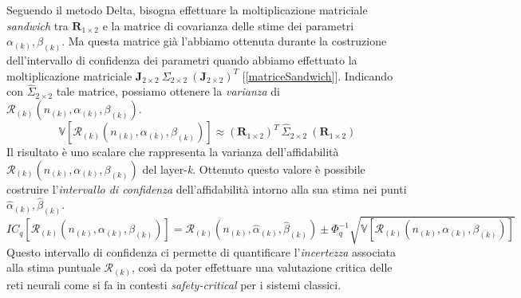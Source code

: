 \documentclass[10pt]{article} %
\begin{document}
Seguendo il metodo Delta, bisogna effettuare la moltiplicazione matriciale \textit{sandwich} tra $\mathbf{R}_{1\times2}$ e la matrice di covarianza delle stime dei parametri $\alpha_{(k)}, \beta_{(k)}$. Ma questa matrice già l'abbiamo ottenuta durante la costruzione dell'intervallo di confidenza dei parametri quando abbiamo effettuato la moltiplicazione matriciale $\mathbf{J}_{2\times2}\ \Sigma_{2\times2}\ (\mathbf{J}_{2\times2})^{T}$ [\ref{matriceSandwich}]. Indicando con $\hat{\Sigma}_{2\times2}$ tale matrice, possiamo ottenere la \textit{varianza} di $\mathcal{R}_{(k)}(n_{(k)}, \alpha_{(k)}, \beta_{(k)})$.
\begin{equation}
    \mathbb{V}[\mathcal{R}_{(k)}(n_{(k)}, \alpha_{(k)}, \beta_{(k)})] \approx (\mathbf{R}_{1\times2})^{T}\ \hat{\Sigma}_{2\times2} \ (\mathbf{R}_{1\times2})  
\end{equation}
Il risultato è uno scalare che rappresenta la varianza dell'affidabilità $\mathcal{R}_{(k)}(n_{(k)}, \alpha_{(k)}, \beta_{(k)})$ del layer-\textit{k}. Ottenuto questo valore è possibile costruire l'\textit{intervallo di confidenza} dell'affidabilità intorno alla sua stima nei punti $\hat{\alpha}_{(k)},\hat{\beta}_{(k)}$.
\begin{equation}
    IC_{q}[\mathcal{R}_{(k)}(n_{(k)}, \alpha_{(k)}, \beta_{(k)})] = \mathcal{R}_{(k)}(n_{(k)}, \hat{\alpha}_{(k)}, \hat{\beta}_{(k)}) \pm \Phi^{-1}_{q}\sqrt{\mathbb{V}[\mathcal{R}_{(k)}(n_{(k)}, \alpha_{(k)}, \beta_{(k)})]}
\end{equation}
Questo intervallo di confidenza ci permette di quantificare l'\textit{incertezza} associata alla stima puntuale $\mathcal{R}_{(k)}$, così da poter effettuare una valutazione critica delle reti neurali come si fa in contesti \textit{safety-critical} per i sistemi classici.
\end{document}
